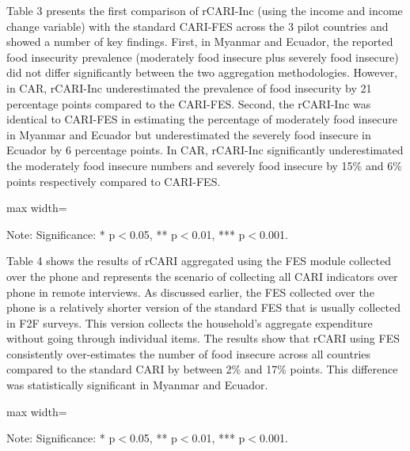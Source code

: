 \documentclass[11pt,harvard]{article}
\begin{document}
Table 3 presents the first comparison of rCARI-Inc (using the income and income change variable) with the standard CARI-FES across the 3 pilot countries and showed a number of key findings. First, in Myanmar and Ecuador, the reported food insecurity prevalence (moderately food insecure plus severely food insecure) did not differ significantly between the two aggregation methodologies. However, in CAR, rCARI-Inc underestimated the prevalence of food insecurity by 21 percentage points compared to the CARI-FES. Second, the rCARI-Inc was identical to CARI-FES in estimating the percentage of moderately food insecure in Myanmar and Ecuador but underestimated the severely food insecure in Ecuador by 6 percentage points. In CAR, rCARI-Inc significantly underestimated the moderately food insecure numbers and severely food insecure by 15\% and 6\% points respectively compared to CARI-FES.


\begin{table}[htbp]
	\centering
	\begin{adjustbox}{max width=\textwidth}
		\begin{threeparttable}
			\caption{Impact of Survey Modality: CARI-FES vs. rCARI-FES}
			\scriptsize
			 
			\label{tab:CARI_FES_rCARI_Modality_All_Country}
			\begin{tablenotes}
				\item Note: Significance: * p$<$0.05, ** p$<$0.01, *** p$<$0.001. 
			\end{tablenotes}
		\end{threeparttable}
	\end{adjustbox}
\end{table}

Table 4 shows the results of rCARI aggregated using the FES module collected over the phone and represents the scenario of collecting all CARI indicators over phone in remote interviews. As discussed earlier, the FES collected over the phone is a relatively shorter version of the standard FES that is usually collected in F2F surveys. This version collects the household's aggregate expenditure without going through individual items. 
The results show that rCARI using FES consistently over-estimates the number of food insecure across all countries compared to the standard CARI by between 2\% and 17\% points. This difference was statistically significant in Myanmar and Ecuador.

\begin{table}[htbp]
	\centering
	\begin{adjustbox}{max width=\textwidth}
		\begin{threeparttable}
			\caption{Impact of Survey Modality: CARI-Inc vs. rCARI-Inc}
			\scriptsize
			 
			\label{tab:Inc_CARI_rCARI_Modality_All_Country}
			\begin{tablenotes}
				\item Note: Significance: * p$<$0.05, ** p$<$0.01, *** p$<$0.001. 
			\end{tablenotes}
		\end{threeparttable}
	\end{adjustbox}
\end{table}
\end{document}
